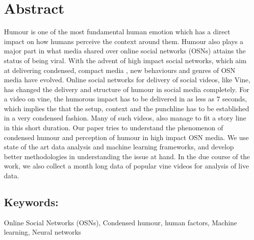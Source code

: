 \section{Abstract}
Humour is one of the most fundamental human emotion which has a direct impact on how humans perceive
the context around them. Humour also plays a major part in what media shared over online social networks (OSNs) attains the status of being viral. With the advent of high impact social networks, which aim at delivering
condensed, compact media , new behaviours and genres of OSN media have evolved. Online social networks for delivery of social videos, like Vine, has changed the delivery and structure of humour in social media completely. For a video on vine, the humorous impact has to be delivered in as less as 7 seconds, which implies the that the setup, context and the punchline has to be established in a very condensed fashion. Many of such videos, also manage to fit a story line in this short duration. Our paper tries to understand the phenomenon of condensed humour and perception of humour in high impact OSN media. We use state of the art data analysis and machine learning frameworks, and develop better methodologies in understanding the issue at hand. In the due course of the work, we also collect a month long data of popular vine videos for analysis of live data. 

\subsection{Keywords:}
Online Social Networks (OSNs), Condensed humour, human factors, Machine learning, Neural networks